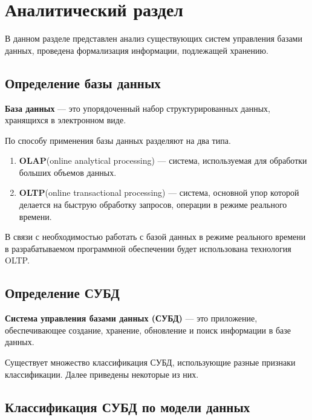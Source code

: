 \chapter{Аналитический раздел}

В данном разделе представлен анализ существующих систем управления базами данных, проведена формализация информации, подлежащей хранению.

\section{Определение базы данных}
\textbf{База данных}\cite{db} --- это упорядоченный набор структурированных данных, хранящихся в электронном виде. 

По способу применения базы данных разделяют на два типа.
\begin{enumerate}
	\item \textbf{OLAP}(online analytical processing) --- система, используемая для обработки больших объемов данных.
	\item \textbf{OLTP}(online transactional processing) --- система, основной упор которой делается на быструю обработку запросов, операции в режиме реального времени.
\end{enumerate}

В связи с необходимостью работать с базой данных в режиме реального времени в разрабатываемом программной обеспечении будет использована технология OLTP.

\section{Определение СУБД}
\textbf{Система управления базами данных (СУБД)} --- это приложение, обеспечивающее создание, хранение, обновление и поиск информации в базе данных.

Существует множество классификация СУБД, использующие разные признаки классификации. Далее приведены некоторые из них.
\section{Классификация СУБД по модели данных}
